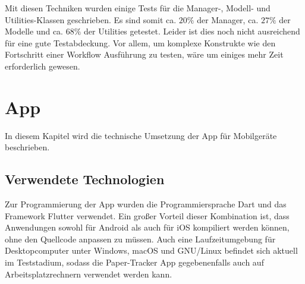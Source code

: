 Mit diesen Techniken wurden einige Tests für die Manager-, Modell- und Utilities-Klassen geschrieben.
Es sind somit ca. $20\%$ der Manager, ca. $27\%$ der Modelle und ca. $68\%$ der Utilities getestet.
Leider ist dies noch nicht ausreichend für eine gute Testabdeckung.
Vor allem, um komplexe Konstrukte wie den Fortschritt einer Workflow Ausführung zu testen, wäre um einiges mehr Zeit erforderlich
gewesen.

\section{App}

In diesem Kapitel wird die technische Umsetzung der App für Mobilgeräte beschrieben.

\subsection{Verwendete Technologien}

Zur Programmierung der App wurden die Programmiersprache Dart und das Framework Flutter verwendet.
Ein großer Vorteil dieser Kombination ist, dass Anwendungen sowohl für Android als auch für iOS
kompiliert werden können, ohne den Quellcode anpassen zu müssen. Auch eine Laufzeitumgebung für
Desktopcomputer unter Windows, macOS und GNU/Linux befindet sich aktuell im Teststadium, sodass die
Paper-Tracker App gegebenenfalls auch auf Arbeitsplatzrechnern verwendet werden kann.

